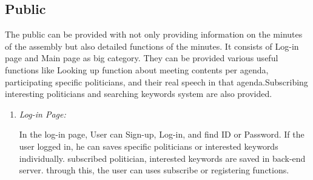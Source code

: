 \documentclass[conference]{IEEEtran}
\begin{document}
\subsection{Public} 
The public can be provided with  not only providing information on the minutes of the assembly but also detailed functions of the minutes. It consists of Log-in page and Main page as big category. They can be provided various useful functions like Looking up function about meeting contents per agenda, participating specific politicians, and their real speech in that agenda.Subscribing interesting politicians and searching keywords system are also provided. \\
\begin{enumerate}
    \item \textit {Log-in Page: }
 
    
In the log-in page, User can Sign-up, Log-in, and find ID or Password. If the user logged in, he can saves specific politicians or interested keywords individually. subscribed politician, interested keywords are saved in back-end server. through this, the user can uses subscribe or registering functions.\\
    

\end{enumerate}
\end{document}
